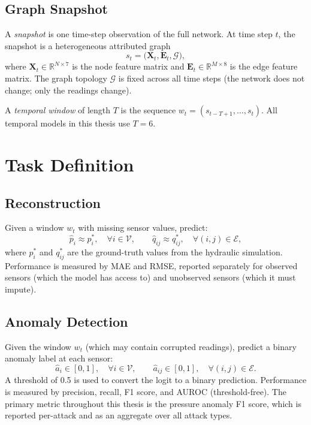 \subsection{Graph Snapshot}

A \emph{snapshot} is one time-step observation of the full network.
At time step $t$, the snapshot is a heterogeneous attributed graph
\begin{equation}
  s_t = \bigl(\mathbf{X}_t, \mathbf{E}_t, \mathcal{G}\bigr),
\end{equation}
where $\mathbf{X}_t \in \mathbb{R}^{N \times 7}$ is the node feature
matrix and $\mathbf{E}_t \in \mathbb{R}^{M \times 8}$ is the edge
feature matrix. The graph topology $\mathcal{G}$ is fixed across
all time steps (the network does not change; only the readings
change).

A \emph{temporal window} of length $T$ is the sequence
$w_t = (s_{t-T+1}, \ldots, s_t)$. All temporal models in this
thesis use $T = 6$.

\section{Task Definition}
\label{sec:task}

\subsection{Reconstruction}

Given a window $w_t$ with missing sensor values, predict:
\begin{equation}
  \hat{p}_i \approx p_i^*, \quad \forall i \in \mathcal{V},
  \qquad
  \hat{q}_{ij} \approx q_{ij}^*, \quad \forall (i,j) \in \mathcal{E},
\end{equation}
where $p_i^*$ and $q_{ij}^*$ are the ground-truth values from the
hydraulic simulation. Performance is measured by MAE
and RMSE, reported separately for observed sensors
(which the model has access to) and unobserved sensors (which it
must impute).

\subsection{Anomaly Detection}

Given the window $w_t$ (which may contain corrupted readings),
predict a binary anomaly label at each sensor:
\begin{equation}
  \hat{a}_i \in [0,1], \quad \forall i \in \mathcal{V},
  \qquad
  \hat{a}_{ij} \in [0,1], \quad \forall (i,j) \in \mathcal{E}.
\end{equation}
A threshold of 0.5 is used to convert the logit to a binary
prediction. Performance is measured by precision, recall, F1 score,
and AUROC (threshold-free). The primary metric throughout
this thesis is the pressure anomaly F1 score, which is
reported per-attack and as an aggregate over all attack types.

